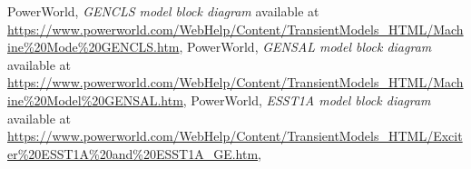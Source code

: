 \documentclass[12pt]{article}
\begin{document}
\begin{thebibliography}{20}

  PowerWorld,
  \textit{GENCLS model block diagram}
  available at \url{https://www.powerworld.com/WebHelp/Content/TransientModels_HTML/Machine\%20Mode\%20GENCLS.htm},
  PowerWorld,
  \textit{GENSAL model block diagram}
  available at \url{https://www.powerworld.com/WebHelp/Content/TransientModels_HTML/Machine\%20Model\%20GENSAL.htm},
  PowerWorld,
  \textit{ESST1A model block diagram}
  available at \url{https://www.powerworld.com/WebHelp/Content/TransientModels_HTML/Exciter\%20ESST1A\%20and\%20ESST1A_GE.htm},

\end{thebibliography}
\end{document}
